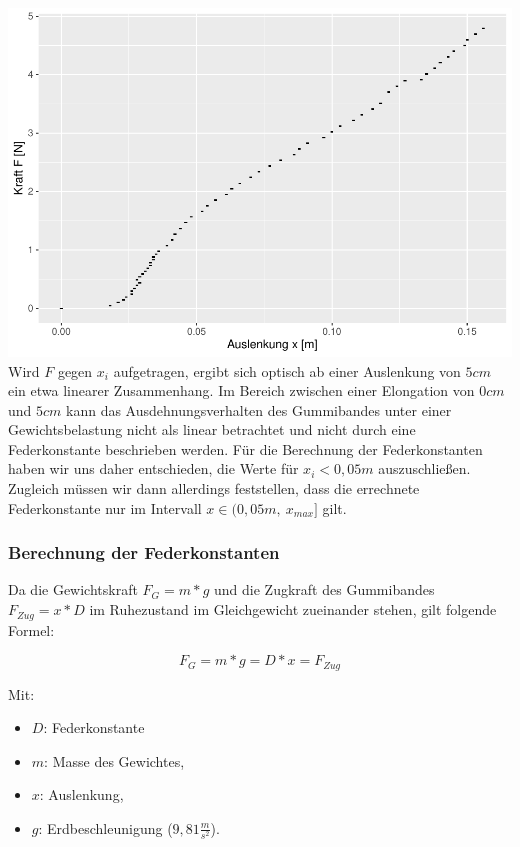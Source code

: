 \documentclass[
]{article}
\providecommand{\tightlist}{%
  \setlength{\itemsep}{0pt}\setlength{\parskip}{0pt}}
\begin{document}
\includegraphics{DehnbareStoffe_files/figure-latex/unnamed-chunk-5-1.pdf}
Wird \(F\) gegen \(x_i\) aufgetragen, ergibt sich optisch ab einer
Auslenkung von \(5cm\) ein etwa linearer Zusammenhang. Im Bereich
zwischen einer Elongation von \(0cm\) und \(5cm\) kann das
Ausdehnungsverhalten des Gummibandes unter einer Gewichtsbelastung nicht
als linear betrachtet und nicht durch eine Federkonstante beschrieben
werden. Für die Berechnung der Federkonstanten haben wir uns daher
entschieden, die Werte für \(x_i<0,05m\) auszuschließen. Zugleich müssen
wir dann allerdings feststellen, dass die errechnete Federkonstante nur
im Intervall \(x \in (0,05m,\ x_{max}]\) gilt.

\hypertarget{berechnung-der-federkonstanten}{%
\subsubsection{Berechnung der
Federkonstanten}\label{berechnung-der-federkonstanten}}

Da die Gewichtskraft \(F_G=m*g\) und die Zugkraft des Gummibandes
\(F_{Zug} = x * D\) im Ruhezustand im Gleichgewicht zueinander stehen,
gilt folgende Formel:

\[F_G = m * g = D*x = F_{Zug}\]

Mit:

\begin{itemize}
\tightlist
\item
  \(D\): Federkonstante
\item
  \(m\): Masse des Gewichtes,
\item
  \(x\): Auslenkung,
\item
  \(g\): Erdbeschleunigung (\(9,81\frac{m}{s^2}\)).
\end{itemize}
\end{document}
